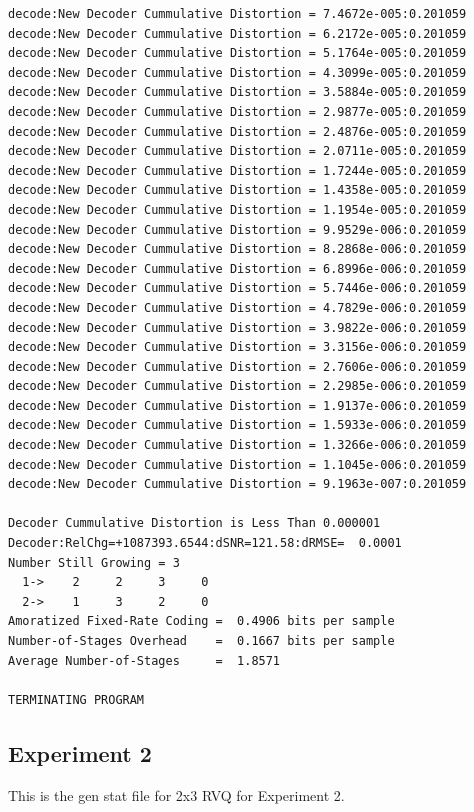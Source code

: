 \begin{verbatim}
decode:New Decoder Cummulative Distortion = 7.4672e-005:0.201059
decode:New Decoder Cummulative Distortion = 6.2172e-005:0.201059
decode:New Decoder Cummulative Distortion = 5.1764e-005:0.201059
decode:New Decoder Cummulative Distortion = 4.3099e-005:0.201059
decode:New Decoder Cummulative Distortion = 3.5884e-005:0.201059
decode:New Decoder Cummulative Distortion = 2.9877e-005:0.201059
decode:New Decoder Cummulative Distortion = 2.4876e-005:0.201059
decode:New Decoder Cummulative Distortion = 2.0711e-005:0.201059
decode:New Decoder Cummulative Distortion = 1.7244e-005:0.201059
decode:New Decoder Cummulative Distortion = 1.4358e-005:0.201059
decode:New Decoder Cummulative Distortion = 1.1954e-005:0.201059
decode:New Decoder Cummulative Distortion = 9.9529e-006:0.201059
decode:New Decoder Cummulative Distortion = 8.2868e-006:0.201059
decode:New Decoder Cummulative Distortion = 6.8996e-006:0.201059
decode:New Decoder Cummulative Distortion = 5.7446e-006:0.201059
decode:New Decoder Cummulative Distortion = 4.7829e-006:0.201059
decode:New Decoder Cummulative Distortion = 3.9822e-006:0.201059
decode:New Decoder Cummulative Distortion = 3.3156e-006:0.201059
decode:New Decoder Cummulative Distortion = 2.7606e-006:0.201059
decode:New Decoder Cummulative Distortion = 2.2985e-006:0.201059
decode:New Decoder Cummulative Distortion = 1.9137e-006:0.201059
decode:New Decoder Cummulative Distortion = 1.5933e-006:0.201059
decode:New Decoder Cummulative Distortion = 1.3266e-006:0.201059
decode:New Decoder Cummulative Distortion = 1.1045e-006:0.201059
decode:New Decoder Cummulative Distortion = 9.1963e-007:0.201059

Decoder Cummulative Distortion is Less Than 0.000001
Decoder:RelChg=+1087393.6544:dSNR=121.58:dRMSE=  0.0001
Number Still Growing = 3
  1->    2     2     3     0 
  2->    1     3     2     0 
Amoratized Fixed-Rate Coding =  0.4906 bits per sample
Number-of-Stages Overhead    =  0.1667 bits per sample
Average Number-of-Stages     =  1.8571

TERMINATING PROGRAM
\end{verbatim}
\normalsize

\clearpage
\newpage
\subsection{Experiment 2}
\label{Exp2_gen_stat}
This is the gen stat file for 2x3 RVQ for Experiment 2.


